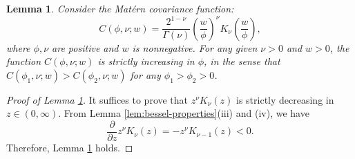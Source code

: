 \documentclass[11pt]{article}
\newtheorem{lemma}{Lemma}
\theoremstyle{definition}
\theoremstyle{remark}
\begin{document}
\begin{lemma}\label{lem:matern-fixed-smoothness-distinguishable}
Consider the Mat\'ern covariance function: 
$$
C(\phi, \nu; w) = \frac{2^{1-\nu}}{\Gamma(\nu)}\left( \frac{w}{\phi} \right)^\nu  K_\nu \left(\frac{w}{\phi}\right),
$$
where $\phi, \nu$ are positive and $w$ is nonnegative. 
For any given $\nu>0$ and $w>0$, the function $C(\phi, \nu; w)$ is strictly increasing in $\phi$, in the sense that $C(\phi_1, \nu; w) > C(\phi_2, \nu; w)$ for any $\phi_1 > \phi_2 > 0$. 
\end{lemma}

\begin{proof}[Proof of Lemma \ref{lem:matern-fixed-smoothness-distinguishable}]
It suffices to prove that $z^\nu K_\nu(z)$ is strictly decreasing in $z \in (0, \infty)$. 
From Lemma \ref{lem:bessel-properties}(iii) and (iv), we have 
\[
\frac{\partial}{\partial z} z^\nu K_\nu(z) = -z^\nu K_{\nu-1}(z) < 0.
\] 
Therefore, Lemma \ref{lem:matern-fixed-smoothness-distinguishable} holds. 
\end{proof}
\end{document}
